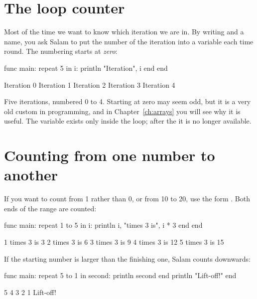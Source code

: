 \section{The loop counter}

Most of the time we want to know which iteration we are in. By writing
 and a name, you ask Salam to put the number of the iteration into a
variable each time round. The numbering starts at \emph{zero}:

\begin{salamcode}
func main:
    repeat 5 in i:
        println "Iteration", i
    end
end
\end{salamcode}

\begin{salamout}
Iteration 0
Iteration 1
Iteration 2
Iteration 3
Iteration 4
\end{salamout}

Five iterations, numbered 0 to 4. Starting at zero may seem odd, but it is a
very old custom in programming, and in Chapter~\ref{ch:arrays} you will see
why it is useful. The variable  exists only inside the loop; after
the  it is no longer available.

\section{Counting from one number to another}

If you want to count from 1 rather than 0, or from 10 to 20, use the form
. Both ends of the range are counted:

\begin{salamcode}
func main:
    repeat 1 to 5 in i:
        println i, "times 3 is", i * 3
    end
end
\end{salamcode}

\begin{salamout}
1 times 3 is 3
2 times 3 is 6
3 times 3 is 9
4 times 3 is 12
5 times 3 is 15
\end{salamout}

If the starting number is larger than the finishing one, Salam counts
downwards:

\begin{salamcode}
func main:
    repeat 5 to 1 in second:
        println second
    end
    println "Lift-off!"
end
\end{salamcode}

\begin{salamout}
5
4
3
2
1
Lift-off!
\end{salamout}

